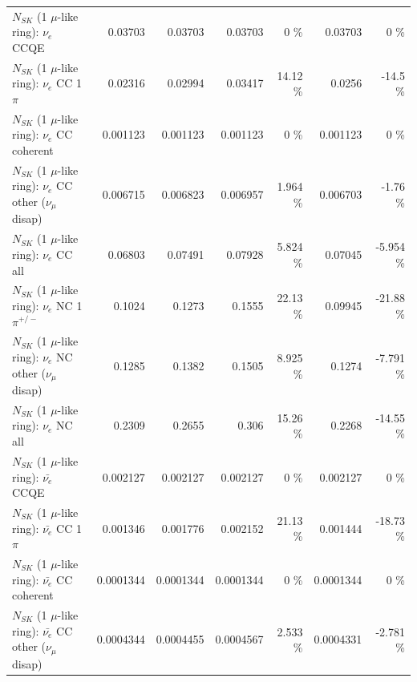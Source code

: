 \begin{table}
\begin{tabular}{| l | r | r | r  r | r  r |}
\hline
\hline
\hline
                                      $N_{SK}$ (1 $\mu$-like ring): $\nu_e$ CCQE &         0.03703 &         0.03703 &         0.03703 &        0 \%  &         0.03703 &        0 \%  \\ 
                                 $N_{SK}$ (1 $\mu$-like ring): $\nu_e$ CC 1$\pi$ &         0.02316 &         0.02994 &         0.03417 &    14.12 \%  &          0.0256 &    -14.5 \%  \\ 
                               $N_{SK}$ (1 $\mu$-like ring): $\nu_e$ CC coherent &        0.001123 &        0.001123 &        0.001123 &        0 \%  &        0.001123 &        0 \%  \\ 
                $N_{SK}$ (1 $\mu$-like ring): $\nu_e$ CC other ($\nu_\mu$ disap) &        0.006715 &        0.006823 &        0.006957 &    1.964 \%  &        0.006703 &    -1.76 \%  \\ 
                                  $N_{SK}$ (1 $\mu$-like ring): $\nu_{e}$ CC all &         0.06803 &         0.07491 &         0.07928 &    5.824 \%  &         0.07045 &   -5.954 \%  \\ 
\hline
                           $N_{SK}$ (1 $\mu$-like ring): $\nu_e$ NC 1$\pi^{+/-}$ &          0.1024 &          0.1273 &          0.1555 &    22.13 \%  &         0.09945 &   -21.88 \%  \\ 
                $N_{SK}$ (1 $\mu$-like ring): $\nu_e$ NC other ($\nu_\mu$ disap) &          0.1285 &          0.1382 &          0.1505 &    8.925 \%  &          0.1274 &   -7.791 \%  \\ 
                                  $N_{SK}$ (1 $\mu$-like ring): $\nu_{e}$ NC all &          0.2309 &          0.2655 &           0.306 &    15.26 \%  &          0.2268 &   -14.55 \%  \\ 
\hline
\hline
\hline
                                $N_{SK}$ (1 $\mu$-like ring): $\bar{\nu_e}$ CCQE &        0.002127 &        0.002127 &        0.002127 &        0 \%  &        0.002127 &        0 \%  \\ 
                           $N_{SK}$ (1 $\mu$-like ring): $\bar{\nu_e}$ CC 1$\pi$ &        0.001346 &        0.001776 &        0.002152 &    21.13 \%  &        0.001444 &   -18.73 \%  \\ 
                         $N_{SK}$ (1 $\mu$-like ring): $\bar{\nu_e}$ CC coherent &       0.0001344 &       0.0001344 &       0.0001344 &        0 \%  &       0.0001344 &        0 \%  \\ 
          $N_{SK}$ (1 $\mu$-like ring): $\bar{\nu_e}$ CC other ($\nu_\mu$ disap) &       0.0004344 &       0.0004455 &       0.0004567 &    2.533 \%  &       0.0004331 &   -2.781 \%  \\ 

\end{tabular}
\end{table}
